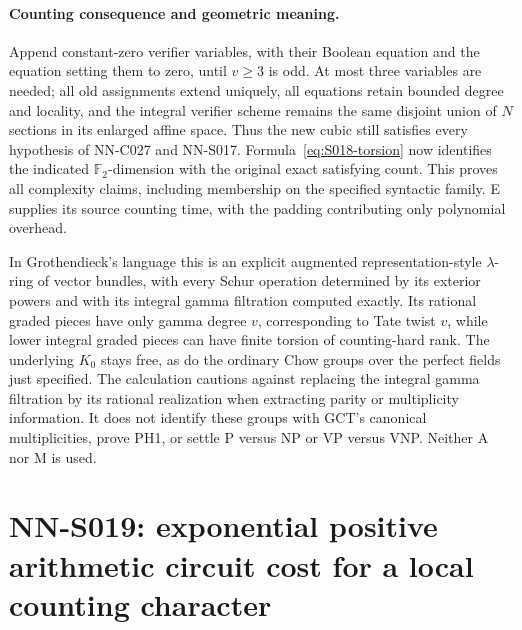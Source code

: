 \paragraph{Counting consequence and geometric meaning.}
Append constant-zero verifier variables, with their Boolean equation
and the equation setting them to zero, until $v\ge3$ is odd.
At most three variables are needed; all old assignments extend
uniquely, all equations retain bounded degree and locality, and
the integral verifier scheme remains the same disjoint union of
$N$ sections in its enlarged affine space. Thus the new cubic
still satisfies every hypothesis of NN-C027 and NN-S017.
Formula~\eqref{eq:S018-torsion} now identifies the indicated
$\mathbb F_2$-dimension with the original exact satisfying count.
This proves all complexity claims, including membership on the
specified syntactic family. E supplies its source counting time,
with the padding contributing only polynomial overhead.

In Grothendieck's language this is an explicit augmented
representation-style $\lambda$-ring of vector bundles, with every
Schur operation determined by its exterior powers and with its
integral gamma filtration computed exactly. Its rational graded
pieces have only gamma degree $v$, corresponding to Tate twist
$v$, while lower
integral graded pieces can have finite torsion of counting-hard
rank. The underlying $K_0$ stays free, as do the ordinary Chow groups
over the perfect fields just specified.
The calculation cautions against replacing the integral gamma
filtration by its rational realization when extracting parity
or multiplicity information. It does not identify these groups
with GCT's canonical multiplicities, prove PH1, or settle P versus
NP or VP versus VNP. Neither A nor M is used.



\section{NN-S019: exponential positive arithmetic circuit cost for a local counting character}

